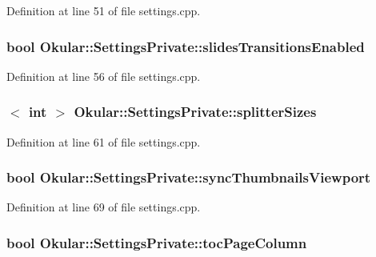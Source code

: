 Definition at line 51 of file settings.\+cpp.

\hypertarget{classOkular_1_1SettingsPrivate_a7d05aafe4b651b151b139b0bfc23aa07}{
\subsubsection[{slides\+Transitions\+Enabled}]{\setlength{\rightskip}{0pt plus 5cm}bool Okular\+::\+Settings\+Private\+::slides\+Transitions\+Enabled}}\label{classOkular_1_1SettingsPrivate_a7d05aafe4b651b151b139b0bfc23aa07}


Definition at line 56 of file settings.\+cpp.

\hypertarget{classOkular_1_1SettingsPrivate_aece94cfa10fd07eaa728409e50320fb7}{
\subsubsection[{splitter\+Sizes}]{$<$ int $>$ Okular\+::\+Settings\+Private\+::splitter\+Sizes}}\label{classOkular_1_1SettingsPrivate_aece94cfa10fd07eaa728409e50320fb7}


Definition at line 61 of file settings.\+cpp.

\hypertarget{classOkular_1_1SettingsPrivate_a567633dcf70a6083fde5ef44fdbe2686}{
\subsubsection[{sync\+Thumbnails\+Viewport}]{\setlength{\rightskip}{0pt plus 5cm}bool Okular\+::\+Settings\+Private\+::sync\+Thumbnails\+Viewport}}\label{classOkular_1_1SettingsPrivate_a567633dcf70a6083fde5ef44fdbe2686}


Definition at line 69 of file settings.\+cpp.

\hypertarget{classOkular_1_1SettingsPrivate_a61bcaf2845f9e0d30cb834d25a96394a}{
\subsubsection[{toc\+Page\+Column}]{\setlength{\rightskip}{0pt plus 5cm}bool Okular\+::\+Settings\+Private\+::toc\+Page\+Column}}\label{classOkular_1_1SettingsPrivate_a61bcaf2845f9e0d30cb834d25a96394a}


